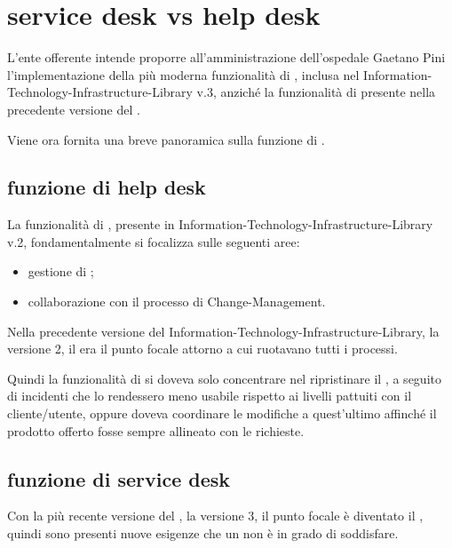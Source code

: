 %
%
\section[Service Desk vs Help Desk]{service desk vs help desk}
\label{sd-sd-vs-hd}
L'ente offerente intende proporre all'amministrazione dell'ospedale Gaetano Pini l'implementazione della più moderna funzionalità di , inclusa nel  \ac{Information-Technology-Infrastructure-Library} v.3, anziché la funzionalità di  presente nella precedente versione del .

Viene ora fornita una breve panoramica sulla funzione di .

\subsection[Funzione di Help Desk]{funzione di help desk}
\label{sd-hd}
La funzionalità di , presente in \ac{Information-Technology-Infrastructure-Library} v.2, fondamentalmente si focalizza sulle seguenti aree:

\begin{itemize}
\item{gestione di ;}
\item{collaborazione con il processo di \ac{Change-Management}.}
\end{itemize}

Nella precedente versione del  \ac{Information-Technology-Infrastructure-Library}, la versione 2, il  era il punto focale attorno a cui ruotavano tutti i processi.

Quindi la funzionalità di  si doveva solo concentrare nel ripristinare il , a seguito di incidenti che lo rendessero meno usabile rispetto ai livelli pattuiti con il cliente/utente, oppure doveva coordinare le modifiche a quest'ultimo affinché il prodotto offerto fosse sempre allineato con le richieste.

\subsection[Funzione di Service Desk]{funzione di service desk}
\label{sd-sd}
Con la più recente versione del , la versione 3, il punto focale è diventato il , quindi sono presenti nuove esigenze che un  non è in grado di soddisfare.

